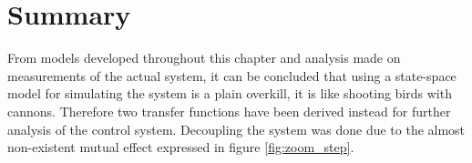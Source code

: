 \section{Summary}
From models developed throughout this chapter and analysis made on measurements of the actual system, it can be concluded that using a state-space model for simulating the system is a plain overkill, it is like shooting birds with cannons. Therefore two transfer functions have been derived instead for further analysis of the control system. Decoupling the system was done due to the almost non-existent mutual effect expressed in figure \ref{fig:zoom_step}. 